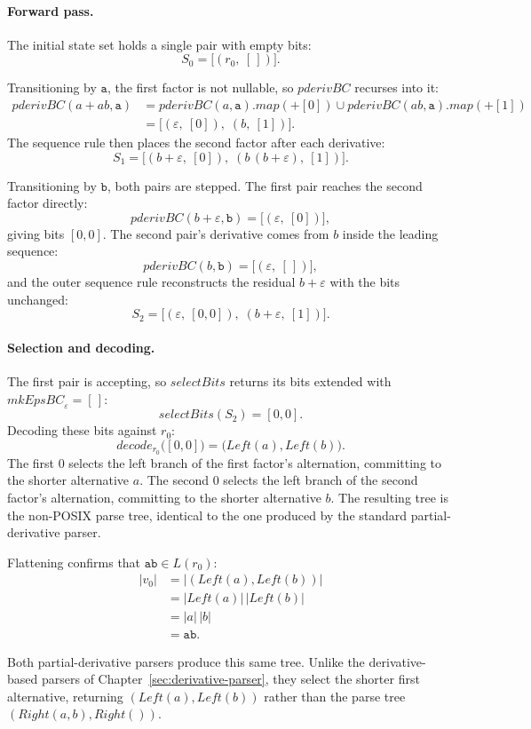 %

\paragraph{Forward pass.}
The initial state set holds a single pair with empty bits:
\[
S_0 = \bigl[(r_0,\ [\,])\bigr].
\]

Transitioning by $\mathtt{a}$, the first factor is not nullable, so
$\mathit{pderivBC}$ recurses into it:
\[
\begin{aligned}
\mathit{pderivBC}(a + ab, \mathtt{a})
  &= \mathit{pderivBC}(a, \mathtt{a}).\mathit{map}(+[0])
     \cup \mathit{pderivBC}(ab, \mathtt{a}).\mathit{map}(+[1]) \\
  &= \bigl[(\varepsilon,\ [0]),\;
            (b,\ [1])\bigr].
\end{aligned}
\]
The sequence rule then places the second factor after each derivative:
\[
S_1 = \bigl[
  (b + \varepsilon,\ [0]),\;
  (b\,(b + \varepsilon),\ [1])\bigr].
\]

Transitioning by $\mathtt{b}$, both pairs are stepped. 
The first pair reaches the second factor directly:
\[
\mathit{pderivBC}(b + \varepsilon, \mathtt{b})
  = \bigl[(\varepsilon,\ [0])\bigr],
\]
giving bits $[0, 0]$. The second pair's
derivative comes from $b$ inside the leading sequence:
\[
\mathit{pderivBC}(b, \mathtt{b}) = \bigl[(\varepsilon,\ [\,])\bigr],
\]
and the outer sequence rule reconstructs the residual $b + \varepsilon$ with
the bits unchanged:
\[
S_2 = \bigl[
  (\varepsilon,\ [0, 0]),\;
  (b + \varepsilon,\ [1])\bigr].
\]

%

\paragraph{Selection and decoding.}
The first pair is accepting, so $\mathit{selectBits}$ returns its
bits extended with $\mathit{mkEpsBC}_\varepsilon = [\,]$:
\[
\mathit{selectBits}(S_2) = [0, 0].
\]
Decoding these bits against $r_0$:
\[
\mathit{decode}_{r_0}\bigl([0, 0]\bigr)
  = \bigl(\mathit{Left}(a), \mathit{Left}(b)\bigr).
\]
The first $0$ selects the left branch of the first factor's
alternation, committing to the shorter alternative $a$. The second
$0$ selects the left branch of the second factor's alternation,
committing to the shorter alternative $b$. The resulting tree is the non-POSIX
parse tree, identical to the one produced by the standard partial-derivative
parser.

Flattening confirms that $\mathtt{ab} \in L(r_0)$:
\[
\begin{aligned}
|v_0|
  &= |(\mathit{Left}(a), \mathit{Left}(b))| \\
  &= |\mathit{Left}(a)|\,|\mathit{Left}(b)| \\
  &= |a|\,|b| \\
  &= \mathtt{ab}.
\end{aligned}
\]

Both partial-derivative parsers produce this same tree.
Unlike the derivative-based parsers of
Chapter~\ref{sec:derivative-parser}, 
they select the shorter first alternative, 
returning $(\mathit{Left}(a), \mathit{Left}(b))$ 
rather than the parse tree $(\mathit{Right}(a,b), \mathit{Right}())$.